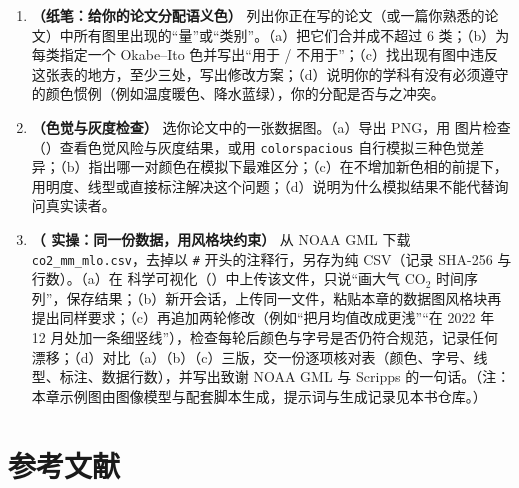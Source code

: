 \begin{enumerate}
\item \textbf{（纸笔：给你的论文分配语义色）} 列出你正在写的论文（或一篇你熟悉的论文）中所有图里出现的“量”或“类别”。（a）把它们合并成不超过 6 类；（b）为每类指定一个 Okabe–Ito 色并写出“用于 / 不用于”；（c）找出现有图中违反这张表的地方，至少三处，写出修改方案；（d）说明你的学科有没有必须遵守的颜色惯例（例如温度暖色、降水蓝绿），你的分配是否与之冲突。
\item \textbf{（色觉与灰度检查）} 选你论文中的一张数据图。（a）导出 PNG，用 \scidraw{} 图片检查（）查看色觉风险与灰度结果，或用 \texttt{colorspacious} 自行模拟三种色觉差异；（b）指出哪一对颜色在模拟下最难区分；（c）在不增加新色相的前提下，用明度、线型或直接标注解决这个问题；（d）说明为什么模拟结果不能代替询问真实读者。
\item \textbf{（\scidraw{} 实操：同一份数据，用风格块约束）} 从 NOAA GML 下载 \texttt{co2\_mm\_mlo.csv}，去掉以 \texttt{\#} 开头的注释行，另存为纯 CSV（记录 SHA-256 与行数）。（a）在 \scidraw{} 科学可视化（）中上传该文件，只说“画大气 $\text{CO}_2$ 时间序列”，保存结果；（b）新开会话，上传同一文件，粘贴本章的数据图风格块再提出同样要求；（c）再追加两轮修改（例如“把月均值改成更浅”“在 2022 年 12 月处加一条细竖线”），检查每轮后颜色与字号是否仍符合规范，记录任何漂移；（d）对比（a）（b）（c）三版，交一份逐项核对表（颜色、字号、线型、标注、数据行数），并写出致谢 NOAA GML 与 Scripps 的一句话。（注：本章示例图由图像模型与配套脚本生成，提示词与生成记录见本书仓库。）
\end{enumerate}

\section*{参考文献}

